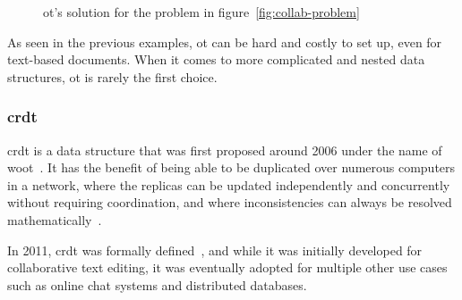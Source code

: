 \begin{toexclude}
  \begin{figure}[H]
    \centerfloat
    \sffamily

    \caption{\acrshort{ot}'s solution for the problem in figure~\ref{fig:collab-problem}}
    \label{fig:collab-sol-ot}
  \end{figure}

  As seen in the previous examples, \acrshort{ot} can be hard and costly to set up, even for text-based documents.
  When it comes to more complicated and nested data structures, \acrshort{ot} is rarely the first choice.

  \subsubsection{\acrshort{crdt}}

  \acrlong{crdt} is a data structure that was first proposed around 2006 under the name of \acrfull{woot}~\autocite{sun_real_2020}.
  It has the benefit of being able to be duplicated over numerous computers in a network, where the replicas can be updated independently and concurrently without requiring coordination, and where inconsistencies can always be resolved mathematically~\autocite{shapiro_conflict-free_2011}.

  In 2011, \acrshort{crdt} was formally defined~\autocite{shapiro_conflict-free_2011}, and while it was initially developed for collaborative text editing, it was eventually adopted for multiple other use cases such as online chat systems and distributed databases.


\end{toexclude}
